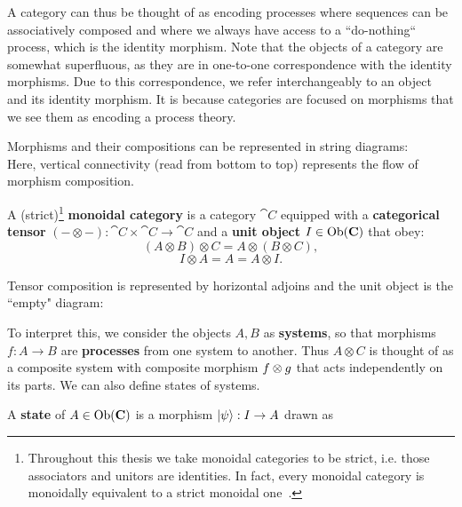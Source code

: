 A category can thus be thought of as encoding processes where sequences can be associatively composed  and where we always have access to a ``do-nothing`` process, which is the identity morphism. Note that the objects of a category are somewhat superfluous, as they are in one-to-one correspondence with the identity morphisms. Due to this correspondence, we refer interchangeably to an object and its identity morphism. It is because categories are focused on morphisms that we see them as encoding a process theory.

Morphisms and their compositions can be represented in string diagrams:
\begin{equation}
\label{eq:composition}

\end{equation}
\noindent Here, vertical connectivity (read from bottom to top) represents the flow of morphism composition.

\begin{defn}
A (strict)\footnote{Throughout this thesis we take monoidal categories to be strict, i.e. those associators and unitors are identities.  In fact, every monoidal category is monoidally equivalent to a strict monoidal one~\cite{joyal1993braided}.} \textbf{monoidal category} is a category $\cat{C}$ equipped with a \textbf{categorical tensor} $(-\otimes-):\cat{C}\times\cat{C}\to\cat{C}$ and a \textbf{unit object} $I\in\mbox{Ob}(\mathbf{C})$ that obey:
\begin{equation}
(A\otimes B)\otimes C = A\otimes(B\otimes C),
\end{equation}
\begin{equation}
I\otimes A = A = A\otimes I.
\end{equation}
\end{defn}

Tensor composition is represented by horizontal adjoins and the unit object is the ``empty" diagram:
\begin{equation}
\label{eq:tensor}

\end{equation}

To interpret this, we consider the objects $A,B$ as \textbf{systems}, so that morphisms $f:A\to B$ are \textbf{processes} from one system to another. Thus $A\otimes C$ is thought of as a composite system with composite morphism $f \otimes g$ that acts independently on its parts. We can also define states of systems.

\begin{defn}
\label{defn:state}
A \textbf{state} of $A\in\mbox{Ob}(\mathbf{C})$ is a morphism $| \psi \rangle:I\to A$ drawn as
\begin{equation}
\label{eq:state}

\end{equation}
\end{defn}

